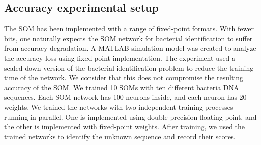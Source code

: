 \subsection{Accuracy experimental setup}\label{ex_setup}
The SOM has been implemented with a range of fixed-point formats. With fewer bits, one naturally expects the SOM network for bacterial identification to suffer from accuracy degradation. A MATLAB simulation model was created to analyze the accuracy loss using fixed-point implementation. The experiment used a scaled-down version of the bacterial identification problem to reduce the training time of the network. We consider that this does not compromise the resulting accuracy of the SOM. We trained 10 SOMs with ten different bacteria DNA sequences. Each SOM network has 100 neurons inside, and each neuron has 20 weights. We trained the networks with two independent training processes running in parallel. One is implemented using double precision floating point, and the other is implemented with fixed-point weights. After training, we used the trained networks to identify the unknown sequence and record their scores.

